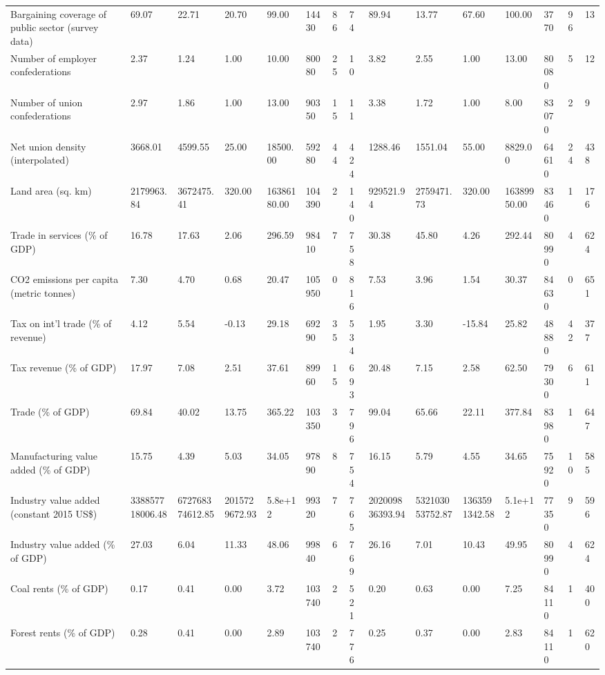 \begin{longtable}{lllllllllllllll}
\addlinespace
Bargaining coverage of public sector (survey data) & 69.07 & 22.71 & 20.70 & 99.00 & 14430 & 86 & 74 & 89.94 & 13.77 & 67.60 & 100.00 & 3770 & 96 & 13\\
Number of employer confederations & 2.37 & 1.24 & 1.00 & 10.00 & 80080 & 25 & 10 & 3.82 & 2.55 & 1.00 & 13.00 & 80080 & 5 & 12\\
Number of union confederations & 2.97 & 1.86 & 1.00 & 13.00 & 90350 & 15 & 11 & 3.38 & 1.72 & 1.00 & 8.00 & 83070 & 2 & 9\\
Net union density (interpolated) & 3668.01 & 4599.55 & 25.00 & 18500.00 & 59280 & 44 & 424 & 1288.46 & 1551.04 & 55.00 & 8829.00 & 64610 & 24 & 438\\
Land area (sq. km) & 2179963.84 & 3672475.41 & 320.00 & 16386180.00 & 104390 & 2 & 140 & 929521.94 & 2759471.73 & 320.00 & 16389950.00 & 83460 & 1 & 176\\
\addlinespace
Trade in services (\% of GDP) & 16.78 & 17.63 & 2.06 & 296.59 & 98410 & 7 & 758 & 30.38 & 45.80 & 4.26 & 292.44 & 80990 & 4 & 624\\
CO2 emissions per capita (metric tonnes) & 7.30 & 4.70 & 0.68 & 20.47 & 105950 & 0 & 816 & 7.53 & 3.96 & 1.54 & 30.37 & 84630 & 0 & 651\\
Tax on int'l trade (\% of revenue) & 4.12 & 5.54 & -0.13 & 29.18 & 69290 & 35 & 534 & 1.95 & 3.30 & -15.84 & 25.82 & 48880 & 42 & 377\\
Tax revenue (\% of GDP) & 17.97 & 7.08 & 2.51 & 37.61 & 89960 & 15 & 693 & 20.48 & 7.15 & 2.58 & 62.50 & 79300 & 6 & 611\\
Trade (\% of GDP) & 69.84 & 40.02 & 13.75 & 365.22 & 103350 & 3 & 796 & 99.04 & 65.66 & 22.11 & 377.84 & 83980 & 1 & 647\\
\addlinespace
Manufacturing value added (\% of GDP) & 15.75 & 4.39 & 5.03 & 34.05 & 97890 & 8 & 754 & 16.15 & 5.79 & 4.55 & 34.65 & 75920 & 10 & 585\\
Industry value added (constant 2015 US\$) & 338857718006.48 & 672768374612.85 & 2015729672.93 & 5.8e+12 & 99320 & 7 & 765 & 202009836393.94 & 532103053752.87 & 1363591342.58 & 5.1e+12 & 77350 & 9 & 596\\
Industry value added (\% of GDP) & 27.03 & 6.04 & 11.33 & 48.06 & 99840 & 6 & 769 & 26.16 & 7.01 & 10.43 & 49.95 & 80990 & 4 & 624\\
Coal rents (\% of GDP) & 0.17 & 0.41 & 0.00 & 3.72 & 103740 & 2 & 521 & 0.20 & 0.63 & 0.00 & 7.25 & 84110 & 1 & 400\\
Forest rents (\% of GDP) & 0.28 & 0.41 & 0.00 & 2.89 & 103740 & 2 & 776 & 0.25 & 0.37 & 0.00 & 2.83 & 84110 & 1 & 620\\

\end{longtable}
